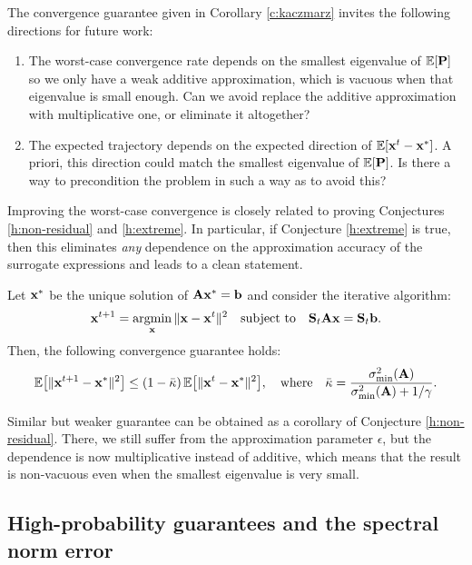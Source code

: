 \documentclass[11pt]{article}
\begin{document}
The convergence guarantee given in Corollary \ref{c:kaczmarz} invites
the following directions for future work:
\begin{enumerate}
\item  The worst-case convergence rate depends on the smallest
  eigenvalue of $\mathbb E[\mathbf P]$ so we only have a weak additive
  approximation, which is vacuous when that eigenvalue is small
  enough.
  Can we avoid replace the additive approximation with multiplicative
  one, or eliminate it altogether?
\item The expected trajectory depends on the expected direction of
  $\mathbb E[\mathbf x^t-\mathbf x^*]$. A priori, this direction could match the smallest
  eigenvalue of $\mathbb E[\mathbf P]$. Is there a way to precondition the
  problem in such a way as to avoid this?
\end{enumerate}
Improving the worst-case convergence  is closely related to proving
Conjectures \ref{h:non-residual} and \ref{h:extreme}. In particular, if Conjecture \ref{h:extreme} is
true, then this eliminates \emph{any} dependence on the approximation
accuracy of the surrogate expressions and leads to a clean statement.
\begin{conjecture}
Let $\mathbf x^*$ be the unique solution of $\mathbf A\mathbf x^*=\mathbf b$ and consider
  the iterative algorithm:
  \begin{align*}
    \mathbf x^{t+1} = \operatorname*{\mathop{\mathrm{argmin}}}_\mathbf x\|\mathbf x-\mathbf x^t\|^2\quad\textnormal{subject to}\quad\mathbf{S}_t\mathbf A\mathbf x=\mathbf{S}_t\mathbf b.
  \end{align*}
Then, the following convergence guarantee holds:
\begin{align}
  \mathbb E\big[\|\mathbf x^{t+1}-\mathbf x^*\|^2\big]
  \leq (1-\bar\kappa)\,\mathbb E\big[\|\mathbf x^{t}-\mathbf x^*\|^2\big],
  \quad\text{where}\quad
  \bar\kappa = \frac{\sigma_{\min}^2(\mathbf A)}{\sigma_{\min}^2(\mathbf A)+1/\gamma}.
\end{align}
\end{conjecture}
Similar but weaker guarantee can be obtained as a corollary of
Conjecture \ref{h:non-residual}. There, we still suffer from the
approximation parameter $\epsilon$, but the dependence is now
multiplicative instead of additive, which means that the result is non-vacuous
even when the smallest eigenvalue is very small.



\subsection{High-probability guarantees and the spectral norm
error} 
\end{document}
